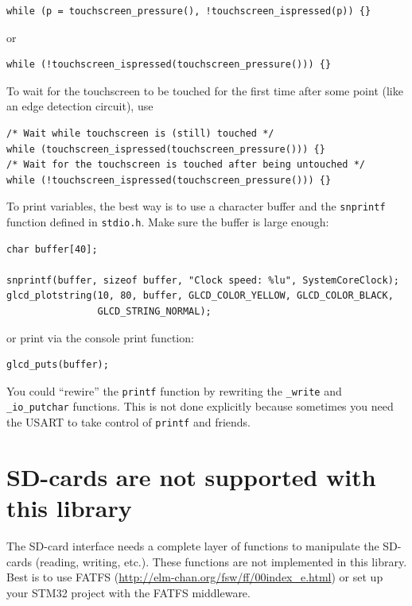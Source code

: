 \documentclass[12pt]{article}
\makeatletter
\newcommand{\ifunc}[1]{\index{#1@\texttt{#1}}}
\makeatother
\begin{document}
\begin{lstlisting}
while (p = touchscreen_pressure(), !touchscreen_ispressed(p)) {}
\end{lstlisting}

or

\begin{lstlisting}
while (!touchscreen_ispressed(touchscreen_pressure())) {}
\end{lstlisting}

To wait for the touchscreen to be touched for the first time after some point (like an edge detection circuit), use

\begin{lstlisting}
/* Wait while touchscreen is (still) touched */
while (touchscreen_ispressed(touchscreen_pressure())) {}
/* Wait for the touchscreen is touched after being untouched */
while (!touchscreen_ispressed(touchscreen_pressure())) {}
\end{lstlisting}

To print variables, the best way is to use a character buffer and the \lstinline|snprintf| \ifunc{snprintf} function defined in \lstinline|stdio.h|. Make sure the buffer is large enough:

\begin{lstlisting}
char buffer[40];

snprintf(buffer, sizeof buffer, "Clock speed: %lu", SystemCoreClock);
glcd_plotstring(10, 80, buffer, GLCD_COLOR_YELLOW, GLCD_COLOR_BLACK,
                GLCD_STRING_NORMAL);
\end{lstlisting}

or print via the console print function:

\begin{lstlisting}
glcd_puts(buffer);
\end{lstlisting}

You could ``rewire'' the \lstinline|printf| function by rewriting the \lstinline|_write| and \lstinline|_io_putchar| functions. This is not done explicitly because sometimes you need the USART to take control of \lstinline|printf| and friends.


\section{SD-cards are not supported with this library}
The SD-card interface needs a complete layer of functions to manipulate the SD-cards (reading, writing, etc.). These functions are not implemented in this library. Best is to use FATFS (\url{http://elm-chan.org/fsw/ff/00index_e.html}) or set up your STM32 project with the FATFS middleware.
\end{document}
